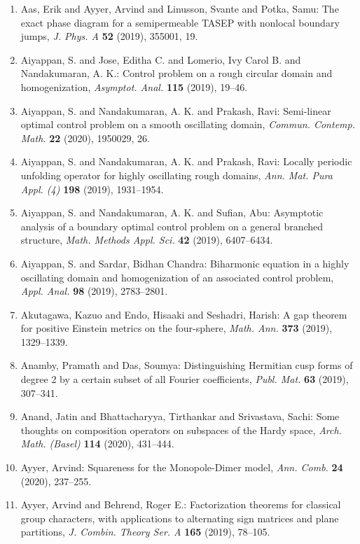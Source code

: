\begin{enumerate}
\item Aas, Erik and Ayyer, Arvind and Linusson, Svante and Potka,
Samu: The exact phase diagram for a semipermeable {TASEP} with
nonlocal boundary jumps, \emph{J. Phys. A} {\bf 52} (2019), 355001, 19.
\item Aiyappan, S. and Jose, Editha C. and Lomerio, Ivy Carol B. and
Nandakumaran, A. K.: Control problem on a rough circular domain and homogenization, \emph{Asymptot. Anal.} {\bf 115} (2019), 19--46.
\item Aiyappan, S. and Nandakumaran, A. K. and Prakash, Ravi: Semi-linear optimal control problem on a smooth oscillating
domain, \emph{Commun. Contemp. Math.} {\bf 22} (2020), 1950029, 26.
\item Aiyappan, S. and Nandakumaran, A. K. and Prakash, Ravi: Locally periodic unfolding operator for highly oscillating
rough domains, \emph{Ann. Mat. Pura Appl. (4)} {\bf 198} (2019), 1931--1954.
\item Aiyappan, S. and Nandakumaran, A. K. and Sufian, Abu: Asymptotic analysis of a boundary optimal control problem on a
general branched structure, \emph{Math. Methods Appl. Sci.} {\bf 42} (2019), 6407--6434.
\item Aiyappan, S. and Sardar, Bidhan Chandra: Biharmonic equation in a highly oscillating domain and
homogenization of an associated control problem, \emph{Appl. Anal.} {\bf 98} (2019), 2783--2801.
\item Akutagawa, Kazuo and Endo, Hisaaki and Seshadri, Harish: A gap theorem for positive {E}instein metrics on the
four-sphere, \emph{Math. Ann.} {\bf 373} (2019), 1329--1339.
\item Anamby, Pramath and Das, Soumya: Distinguishing {H}ermitian cusp forms of degree 2 by a certain
subset of all {F}ourier coefficients, \emph{Publ. Mat.} {\bf 63} (2019), 307--341.
\item Anand, Jatin and Bhattacharyya, Tirthankar and Srivastava,
Sachi: Some thoughts on composition operators on subspaces of the
{H}ardy space, \emph{Arch. Math. (Basel)} {\bf 114} (2020), 431--444.
\item Ayyer, Arvind: Squareness for the {M}onopole-{D}imer model, \emph{Ann. Comb.} {\bf 24} (2020), 237--255.
\item Ayyer, Arvind and Behrend, Roger E.: Factorization theorems for classical group characters, with
applications to alternating sign matrices and plane
partitions, \emph{J. Combin. Theory Ser. A} {\bf 165} (2019), 78--105.

\end{enumerate}
